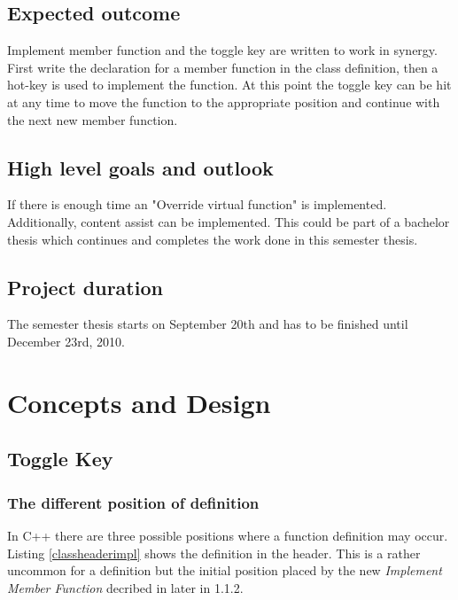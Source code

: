 \documentclass[a4paper,12pt,abstract=on]{scrreprt}
\begin{document}
\section{Expected outcome}

Implement member function and the toggle key are written to work in synergy.
First write the declaration for a member function in the class definition, then
a hot-key is used to implement the function. At this point the toggle key can
be hit at any time to move the function to the appropriate position and
continue with the next new member function.

\section{High level goals and outlook}

If there is enough time an "Override virtual function" is implemented.
Additionally, content assist can be implemented. This could be part of a
bachelor thesis which continues and completes the work done in this semester
thesis.

\section{Project duration}
The semester thesis starts on September 20th and has to be finished until
December 23rd, 2010.

\chapter{Concepts and Design}

\section{Toggle Key}

\subsection{The different position of definition}

In C++ there are three possible positions where a  function definition may occur. Listing \ref{classheaderimpl} shows
the definition in the header. This is a rather uncommon for a definition but the
initial position placed by the new \textit{Implement Member Function} decribed
in later in 1.1.2.

\end{document}
